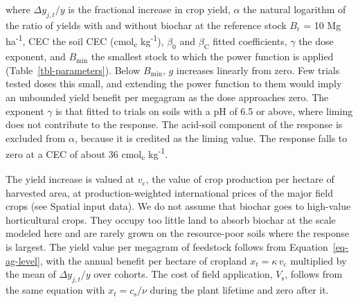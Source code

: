 \documentclass[
  letterpaper,
  twoside,
  twocolumn,
  9pt]{article}
\begin{document}
where \(\Delta y_{j,t}/y\) is the fractional increase in crop yield,
\(\alpha\) the natural logarithm of the ratio of yields with and without
biochar at the reference stock \(B_{\mathrm{r}}\) = 10 Mg
ha\textsuperscript{-1}, CEC the soil CEC (cmol\textsubscript{c}
kg\textsuperscript{-1}), \(\beta_0\) and \(\beta_{\mathrm{C}}\) fitted
coefficients, \(\gamma\) the dose exponent, and \(B_{\mathrm{min}}\) the
smallest stock to which the power function is applied
(Table~\ref{tbl-parameters}). Below \(B_{\mathrm{min}}\), \(g\)
increases linearly from zero. Few trials tested doses this small, and
extending the power function to them would imply an unbounded yield
benefit per megagram as the dose approaches zero. The exponent
\(\gamma\) is that fitted to trials on soils with a pH of 6.5 or above,
where liming does not contribute to the response. The acid-soil
component of the response is excluded from \(\alpha\), because it is
credited as the liming value. The response falls to zero at a CEC of
about 36 cmol\textsubscript{c} kg\textsuperscript{-1}.

The yield increase is valued at \(v_{\mathrm{c}}\), the value of crop
production per hectare of harvested area, at production-weighted
international prices of the major field crops (see Spatial input data).
We do not assume that biochar goes to high-value horticultural crops.
They occupy too little land to absorb biochar at the scale modeled here
and are rarely grown on the resource-poor soils where the response is
largest. The yield value per megagram of feedstock follows from
Equation~\ref{eq-ag-level}, with the annual benefit per hectare of
cropland \(x_t = \kappa\, v_{\mathrm{c}}\) multiplied by the mean of
\(\Delta y_{j,t}/y\) over cohorts. The cost of field application,
\(V_{\mathrm{s}}\), follows from the same equation with
\(x_t = c_{\mathrm{s}}/\nu\) during the plant lifetime and zero after
it.
\end{document}
